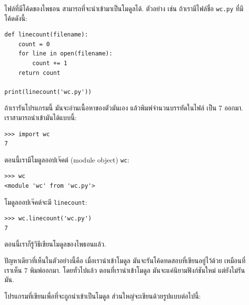 
ไฟล์ที่มีโค้ดของไพธอน สามารถที่จะนำเข้ามาเป็นโมดูลได้.
ตัวอย่าง เช่น ถ้าเรามีไฟล์ชื่อ \texttt{wc.py} ที่มีโค้ดดังนี้:

\begin{verbatim}
def linecount(filename):
    count = 0
    for line in open(filename):
        count += 1
    return count

print(linecount('wc.py'))
\end{verbatim}
%
%
ถ้าเรารันโปรแกรมนี้
มันจะอ่านเนื้อหาของตัวมันเอง แล้วพิมพ์จำนวนบรรทัดในไฟล์ เป็น 7 ออกมา.
เราสามารถนำเข้ามันได้แบบนี้:

\begin{verbatim}
>>> import wc
7
\end{verbatim}
%
%
ตอนนี้เรามีโมดูลออปเจ๊คต์ (module object) \texttt{wc}:

\begin{verbatim}
>>> wc
<module 'wc' from 'wc.py'>
\end{verbatim}
%
%
โมดูลออปเจ๊คต์จะมี \verb"linecount":


\begin{verbatim}
>>> wc.linecount('wc.py')
7
\end{verbatim}
%
%
ตอนนี้เราก็รู้วิธีเขียนโมดูลของไพธอนแล้ว.

%
ปัญหาเดียวที่เห็นในตัวอย่างนี้คือ 
เมื่อเรานำเข้าโมดูล มันจะรันโค้ดทดสอบที่เขียนอยู่ไว้ด้วย เหมือนที่เราเห็น 7 พิมพ์ออกมา.
โดยทั่วไปแล้ว ตอนที่เรานำเข้าโมดูล
มันจะแค่นิยามฟังก์ชันใหม่ แต่ยังไม่รันมัน.


โปรแกรมที่เขียนเพื่อที่จะถูกนำเข้าเป็นโมดูล
ส่วนใหญ่จะเขียนด้วยรูปแบบต่อไปนี้:

